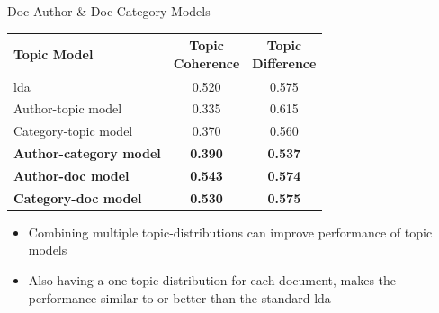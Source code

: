 \begin{frame}{\insertsubsection}{Doc-Author \& Doc-Category Models}
	\begin{table}
		\centering
		\begin{tabular}{l|c|c}
			Topic Model & \makecell{Topic \\ Coherence} & \makecell{Topic \\ Difference} \\
			\midrule
			\Acrlong{lda} & 0.520 & 0.575 \\
			Author-topic model & 0.335 & 0.615 \\
			Category-topic model & 0.370 & 0.560 \\
			\textbf{Author-category model} & \textbf{0.390} & \textbf{0.537} \\
			\textbf{Author-doc model} & \textbf{0.543} & \textbf{0.574} \\
			\textbf{Category-doc model} &\textbf{ 0.530} & \textbf{0.575} \\
		\end{tabular}
	\end{table}
	\begin{itemize}
		\item<2> Combining multiple topic-distributions can improve performance of topic models
		\item<3> Also having a one topic-distribution for each document, makes the performance similar to or better than the standard \gls{lda}
	\end{itemize}
\end{frame}

